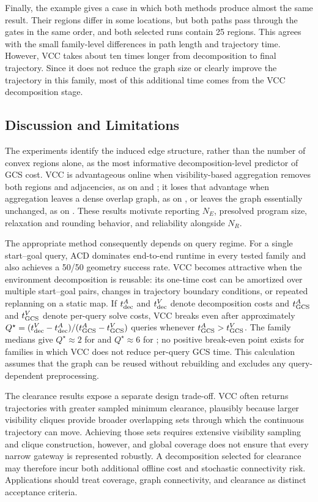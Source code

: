 Finally, the  example gives a case in which both methods produce
almost the same result. Their regions differ in some locations, but both paths
pass through the gates in the same order, and both selected runs contain 25
regions. This agrees with the small family-level differences in path length and
trajectory time. However, VCC takes about ten times longer from decomposition
to final trajectory. Since it does not reduce the graph size or clearly improve
the trajectory in this family, most of this additional time comes from the VCC
decomposition stage.

\subsection{Discussion and Limitations}
The experiments identify the induced edge structure, rather than the number of
convex regions alone, as the most informative decomposition-level predictor of
GCS cost. VCC is advantageous online when visibility-based aggregation removes
both regions and adjacencies, as on  and ; it loses
that advantage when aggregation leaves a dense overlap graph, as on
, or leaves the graph essentially unchanged, as on
. These results motivate reporting $N_E$, presolved program size,
relaxation and rounding behavior, and reliability alongside $N_R$.

The appropriate method consequently depends on query regime. For a single
start--goal query, ACD dominates end-to-end runtime in every tested family and
also achieves a 50/50 geometry success rate. VCC becomes attractive when the
environment decomposition is reusable: its one-time cost can be amortized over
multiple start--goal pairs, changes in trajectory boundary conditions, or
repeated replanning on a static map. If $t_{\rm dec}^{A}$ and
$t_{\rm dec}^{V}$ denote decomposition costs and $t_{\rm GCS}^{A}$ and
$t_{\rm GCS}^{V}$ denote per-query solve costs, VCC breaks even after
approximately
\(
Q^{\star}=(t_{\rm dec}^{V}-t_{\rm dec}^{A})/
(t_{\rm GCS}^{A}-t_{\rm GCS}^{V})
\)
queries whenever $t_{\rm GCS}^{A}>t_{\rm GCS}^{V}$. The family medians give
$Q^{\star}\approx2$ for  and $Q^{\star}\approx6$ for
; no positive break-even point exists for families in which VCC
does not reduce per-query GCS time. This calculation assumes that the graph can
be reused without rebuilding and excludes any query-dependent preprocessing.

The clearance results expose a separate design trade-off. VCC often returns
trajectories with greater sampled minimum clearance, plausibly because larger
visibility cliques provide broader overlapping sets through which the
continuous trajectory can move. Achieving those sets requires extensive
visibility sampling and clique construction, however, and global coverage does
not ensure that every narrow gateway is represented robustly. A decomposition
selected for clearance may therefore incur both additional offline cost and
stochastic connectivity risk. Applications should treat coverage, graph
connectivity, and clearance as distinct acceptance criteria.

